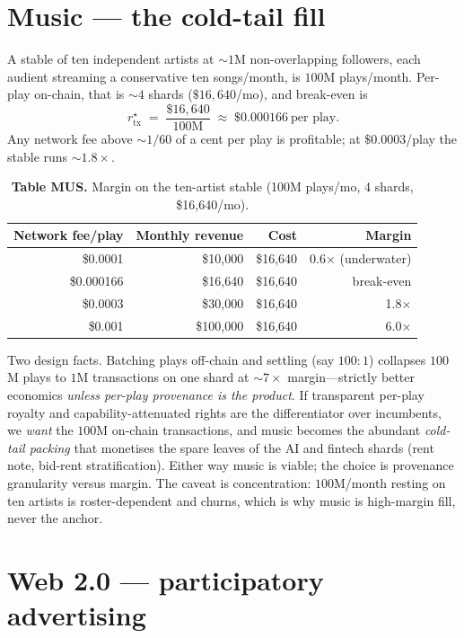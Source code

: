 \documentclass[11pt]{article}
\begin{document}
\section{Music --- the cold-tail fill}
\label{sec:music}

A stable of ten independent artists at ${\sim}1$M non-overlapping followers, each audient streaming a conservative ten songs/month, is $100$M plays/month. Per-play on-chain, that is ${\sim}\num{4}$ shards ($\$16{,}640$/mo), and break-even is
\[
  r_{\text{tx}}^\star \;=\; \frac{\$16{,}640}{100\text{M}} \;\approx\; \$0.000166\ \text{per play}.
\]
Any network fee above ${\sim}1/60$ of a cent per play is profitable; at $\$0.0003$/play the stable runs ${\sim}1.8\times$.

\begin{table}[h]
\centering
\caption*{\textbf{Table MUS.} Margin on the ten-artist stable (100M plays/mo, 4 shards, \$16{,}640/mo).}
\begin{tabular}{@{}rrrr@{}}
\toprule
Network fee/play & Monthly revenue & Cost & Margin \\
\midrule
\$0.0001  & \$10{,}000  & \$16{,}640 & 0.6$\times$ (underwater) \\
\$0.000166 & \$16{,}640 & \$16{,}640 & break-even \\
\$0.0003  & \$30{,}000  & \$16{,}640 & 1.8$\times$ \\
\$0.001   & \$100{,}000 & \$16{,}640 & 6.0$\times$ \\
\bottomrule
\end{tabular}
\end{table}

Two design facts. Batching plays off-chain and settling (say $100{:}1$) collapses $100$M plays to $1$M transactions on one shard at ${\sim}7\times$ margin---strictly better economics \emph{unless per-play provenance is the product}. If transparent per-play royalty and capability-attenuated rights are the differentiator over incumbents, we \emph{want} the $100$M on-chain transactions, and music becomes the abundant \emph{cold-tail packing} that monetises the spare leaves of the AI and fintech shards (rent note, bid-rent stratification). Either way music is viable; the choice is provenance granularity versus margin. The caveat is concentration: $100$M/month resting on ten artists is roster-dependent and churns, which is why music is high-margin fill, never the anchor.

\section{Web 2.0 --- participatory advertising}
\label{sec:web2}
\end{document}
